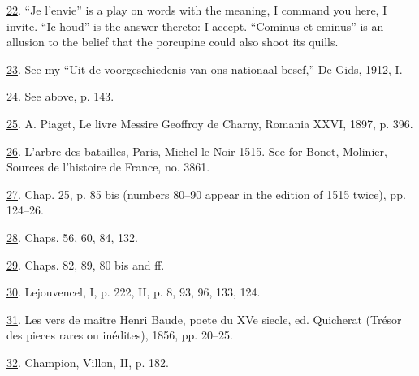 \protect\hypertarget{23_NOTES.xhtmlux5cux23id_589}{\protect\hyperlink{18_Chapter_Eleven__THE_FORMS_OF_THO.xhtmlux5cux23id_588}{22}}.
``Je l'envie'' is a play on words with the meaning, I command you here,
I invite. ``Ic houd'' is the answer thereto: I accept. ``Cominus et
eminus'' is an allusion to the belief that the porcupine could also
shoot its quills.

\protect\hypertarget{23_NOTES.xhtmlux5cux23id_587}{\protect\hyperlink{18_Chapter_Eleven__THE_FORMS_OF_THO.xhtmlux5cux23id_586}{23}}.
See my ``Uit de voorgeschiedenis van ons nationaal besef,'' De Gids,
1912, I.

\protect\hypertarget{23_NOTES.xhtmlux5cux23id_585}{\protect\hyperlink{18_Chapter_Eleven__THE_FORMS_OF_THO.xhtmlux5cux23id_584}{24}}.
See above, p. 143.

\protect\hypertarget{23_NOTES.xhtmlux5cux23id_583}{\protect\hyperlink{18_Chapter_Eleven__THE_FORMS_OF_THO.xhtmlux5cux23id_582}{25}}.
A. Piaget, Le livre Messire Geoffroy de Charny, Romania XXVI, 1897, p.
396.

\protect\hypertarget{23_NOTES.xhtmlux5cux23id_581}{\protect\hyperlink{18_Chapter_Eleven__THE_FORMS_OF_THO.xhtmlux5cux23id_580}{26}}.
L'arbre des batailles, Paris, Michel le Noir 1515. See for Bonet,
Molinier, Sources de l'histoire de France, no. 3861.

\protect\hypertarget{23_NOTES.xhtmlux5cux23page_430}{\protect\hyperlink{18_Chapter_Eleven__THE_FORMS_OF_THO.xhtmlux5cux23id_579}{27}}.
Chap. 25, p. 85 bis (numbers 80--90 appear in the edition of 1515
twice), pp. 124--26.

\protect\hypertarget{23_NOTES.xhtmlux5cux23id_578}{\protect\hyperlink{18_Chapter_Eleven__THE_FORMS_OF_THO.xhtmlux5cux23id_577}{28}}.
Chaps. 56, 60, 84, 132.

\protect\hypertarget{23_NOTES.xhtmlux5cux23id_576}{\protect\hyperlink{18_Chapter_Eleven__THE_FORMS_OF_THO.xhtmlux5cux23id_575}{29}}.
Chaps. 82, 89, 80 bis and ff.

\protect\hypertarget{23_NOTES.xhtmlux5cux23id_574}{\protect\hyperlink{18_Chapter_Eleven__THE_FORMS_OF_THO.xhtmlux5cux23id_573}{30}}.
Lejouvencel, I, p. 222, II, p. 8, 93, 96, 133, 124.

\protect\hypertarget{23_NOTES.xhtmlux5cux23id_572}{\protect\hyperlink{18_Chapter_Eleven__THE_FORMS_OF_THO.xhtmlux5cux23id_571}{31}}.
Les vers de maitre Henri Baude, poete du XVe siecle, ed. Quicherat
(Trésor des pieces rares ou inédites), 1856, pp. 20--25.

\protect\hypertarget{23_NOTES.xhtmlux5cux23id_570}{\protect\hyperlink{18_Chapter_Eleven__THE_FORMS_OF_THO.xhtmlux5cux23id_569}{32}}.
Champion, Villon, II, p. 182.

